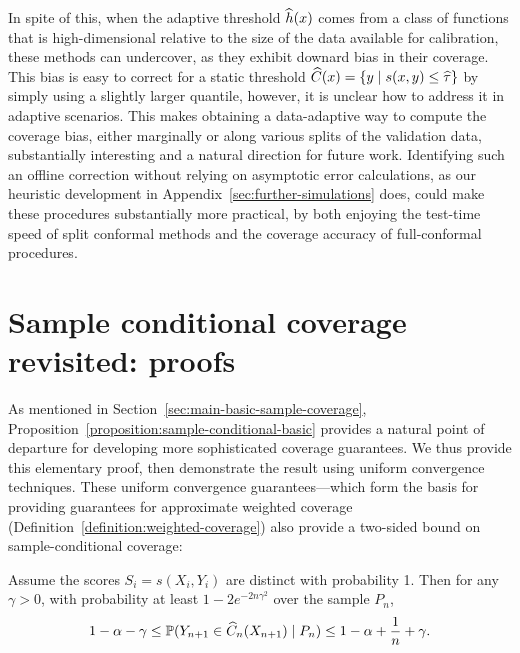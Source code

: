 \documentclass{article}
\newcommand{\scorefunc}{s}
\newcommand{\scoreval}{\scorefunc}
\newcommand{\scorerv}{S}
\begin{document}
In spite of this, when the adaptive threshold
$\widehat{h}(x)$ comes from a class of functions that is high-dimensional
relative to the size of the data available for calibration,
these methods can undercover, as they exhibit downard bias in their
coverage.
%
This bias is easy to correct for a static threshold
$\what{C}(x) = \{y \mid \scoreval(x, y) \le \what{\tau}\}$ by
simply using a slightly larger quantile, however, it is
unclear how to address it in adaptive scenarios.
%
This makes obtaining a data-adaptive way to compute the coverage bias,
either marginally or along various splits of the validation data,
substantially interesting and a natural direction for future work.
%
Identifying such an offline correction without relying on asymptotic error
calculations, as our heuristic development in
Appendix~\ref{sec:further-simulations} does, could make these procedures
substantially more practical, by both enjoying the test-time speed of split
conformal methods and the coverage accuracy of full-conformal procedures.




\newpage

\appendix

\section{Sample conditional coverage revisited: proofs}
\label{sec:revisiting-conditional-coverage}

As mentioned in Section~\ref{sec:main-basic-sample-coverage},
Proposition~\ref{proposition:sample-conditional-basic} provides a natural point of
departure for developing more sophisticated coverage guarantees.
%
We thus provide this elementary proof, then
demonstrate the result using uniform convergence techniques.
%
These uniform convergence guarantees---which form the basis
for providing guarantees for approximate weighted coverage
(Definition~\ref{definition:weighted-coverage}) also
provide a two-sided bound on sample-conditional coverage:
\begin{corollary}
  \label{corollary:distinct-scores}
  Assume the scores $\scorerv_i = \scoreval(X_i, Y_i)$ are distinct with
  probability 1.
  Then for any $\gamma > 0$, with probability at least
  $1 - 2 e^{-2n \gamma^2}$ over the sample $P_n$,
  \begin{equation*}
    1 - \alpha - \gamma
    \le \mathbb{P}(Y_{n + 1} \in \widehat{C}_n(X_{n + 1}) \mid P_n)
    \le 1 - \alpha + \frac{1}{n} + \gamma.
  \end{equation*}
\end{corollary}
\end{document}
